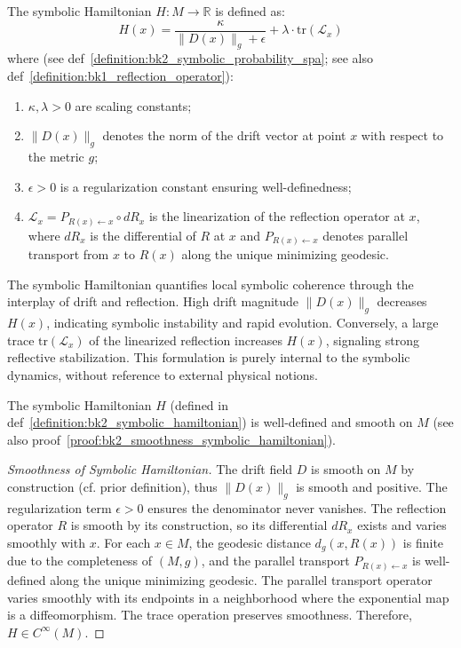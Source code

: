 \begin{definition} 
\label{definition:bk2_symbolic_hamiltonian} 
The symbolic Hamiltonian $H: M \rightarrow \mathbb{R}$ is defined as:
\[
H(x) = \frac{\kappa}{\|D(x)\|_g + \epsilon} + \lambda \cdot \text{tr}(\mathcal{L}_x)
\]
where (see def~\ref{definition:bk2_symbolic_probability_spa}; see also def~\ref{definition:bk1_reflection_operator}):
\begin{enumerate}
    \item $\kappa, \lambda > 0$ are scaling constants;
    \item $\|D(x)\|_g$ denotes the norm of the drift vector at point $x$ with respect to the metric $g$;
    \item $\epsilon > 0$ is a regularization constant ensuring well-definedness;
    \item $\mathcal{L}_x = P_{R(x) \leftarrow x} \circ dR_x$ is the linearization of the reflection operator at $x$, where $dR_x$ is the differential of $R$ at $x$ and $P_{R(x) \leftarrow x}$ denotes parallel transport from $x$ to $R(x)$ along the unique minimizing geodesic.
\end{enumerate}
\end{definition}

\begin{remark} 
\label{remark:bk2_symbolic-hamiltonian}
The symbolic Hamiltonian quantifies local symbolic coherence through the interplay of drift and reflection. High drift magnitude $\|D(x)\|_g$ decreases $H(x)$, indicating symbolic instability and rapid evolution. Conversely, a large trace $\text{tr}(\mathcal{L}_x)$ of the linearized reflection increases $H(x)$, signaling strong reflective stabilization. This formulation is purely internal to the symbolic dynamics, without reference to external physical notions.
\end{remark}

\begin{lemma} 
\label{lem:bk2_wellposedness_symb_hamiltonian} 
The symbolic Hamiltonian $H$ (defined in def~\ref{definition:bk2_symbolic_hamiltonian}) is well-defined and smooth on $M$ (see also proof~\ref{proof:bk2_smoothness_symbolic_hamiltonian}).
\end{lemma}

\begin{proof}[Smoothness of Symbolic Hamiltonian]
\label{proof:bk2_smoothness_symbolic_hamiltonian}
The drift field $D$ is smooth on $M$ by construction (cf. prior definition), thus $\|D(x)\|_g$ is smooth and positive. The regularization term $\epsilon > 0$ ensures the denominator never vanishes. The reflection operator $R$ is smooth by its construction, so its differential $dR_x$ exists and varies smoothly with $x$. For each $x \in M$, the geodesic distance $d_g(x, R(x))$ is finite due to the completeness of $(M, g)$, and the parallel transport $P_{R(x) \leftarrow x}$ is well-defined along the unique minimizing geodesic. The parallel transport operator varies smoothly with its endpoints in a neighborhood where the exponential map is a diffeomorphism. The trace operation preserves smoothness. Therefore, $H \in C^\infty(M)$.
\end{proof}

